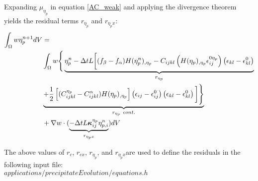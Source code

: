 \documentclass[11pt]{article}
\renewcommand{\=}[1]{\stackrel{#1}{=}} %
\theoremstyle{definition}
\theoremstyle{remark}
\def\Bkappa{\mbox{\boldmath$\kappa$}}
\begin{document}
Expanding $\mu_{\eta_p}$ in equation \ref{AC_weak} and applying the divergence theorem yields the residual terms $r_{\eta_p}$ and $r_{\eta_p x}$:
\begin{equation}
\begin{split}
\int_\Omega w \eta_p^{n+1} dV &= \\
&\int_\Omega w \Bigg\{\underbrace{\eta_p^{n}-\Delta t L \bigg[(f_{\beta}-f_{\alpha})H(\eta_p^n)_{,\eta_p} - C_{ijkl} \left( H(\eta_p)_{,\eta_p} \epsilon_{ij}^{0 \eta_p}\right)\left(\epsilon_{kl} - \epsilon_{kl}^{0} \right) }_{r_{\eta_p}} \\
&\underbrace{+ \frac{1}{2} \left[ (C_{ijkl}^{\eta_p} - C_{ijkl}^{\alpha}) H(\eta_p)_{,\eta_p} \right] \left(\epsilon_{ij} - \epsilon_{ij}^{0} \right) \left(\epsilon_{kl} - \epsilon_{kl}^{0} \right) \bigg] \Bigg\}}_{r_{\eta_p}~cont.}  \\
&+ \nabla w \cdot (\underbrace{-\Delta t  L \Bkappa^{\eta_p}_{ij} \eta_{p,i}^n}_{r_{\eta_p x}} ) dV 
\end{split}
\end{equation}

The above values of $r_c$, $r_{cx}$,  $r_{\eta_p}$, and $r_{\eta_p x}$are used to define the residuals in the following input file: \\
$applications/precipitateEvolution/equations.h$
\end{document}
